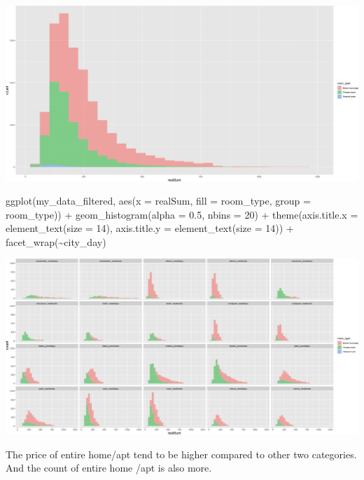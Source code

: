 \documentclass[
]{article}
\newenvironment{Shaded}{\begin{snugshade}}{\end{snugshade}}
\newcommand{\AttributeTok}[1]{\textcolor[rgb]{0.77,0.63,0.00}{#1}}
\newcommand{\DecValTok}[1]{\textcolor[rgb]{0.00,0.00,0.81}{#1}}
\newcommand{\FloatTok}[1]{\textcolor[rgb]{0.00,0.00,0.81}{#1}}
\newcommand{\FunctionTok}[1]{\textcolor[rgb]{0.00,0.00,0.00}{#1}}
\newcommand{\NormalTok}[1]{#1}
\newcommand{\SpecialCharTok}[1]{\textcolor[rgb]{0.00,0.00,0.00}{#1}}
\begin{document}
\includegraphics{Project_files/figure-latex/unnamed-chunk-18-2.png}

\begin{Shaded}
\begin{Highlighting}[]
\FunctionTok{ggplot}\NormalTok{(my\_data\_filtered, }\FunctionTok{aes}\NormalTok{(}\AttributeTok{x =}\NormalTok{ realSum, }\AttributeTok{fill =}\NormalTok{ room\_type, }\AttributeTok{group =}\NormalTok{ room\_type)) }\SpecialCharTok{+}
    \FunctionTok{geom\_histogram}\NormalTok{(}\AttributeTok{alpha =} \FloatTok{0.5}\NormalTok{, }\AttributeTok{nbins =} \DecValTok{20}\NormalTok{) }\SpecialCharTok{+} \FunctionTok{theme}\NormalTok{(}\AttributeTok{axis.title.x =} \FunctionTok{element\_text}\NormalTok{(}\AttributeTok{size =} \DecValTok{14}\NormalTok{),}
    \AttributeTok{axis.title.y =} \FunctionTok{element\_text}\NormalTok{(}\AttributeTok{size =} \DecValTok{14}\NormalTok{)) }\SpecialCharTok{+} \FunctionTok{facet\_wrap}\NormalTok{(}\SpecialCharTok{\textasciitilde{}}\NormalTok{city\_day)}
\end{Highlighting}
\end{Shaded}

\includegraphics{Project_files/figure-latex/unnamed-chunk-18-3.png}

The price of entire home/apt tend to be higher compared to other two
categories. And the count of entire home /apt is also more.
\end{document}
